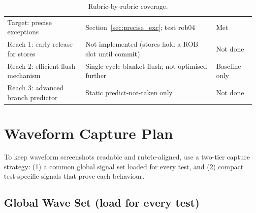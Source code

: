 \documentclass[11pt]{article}
\begin{document}
\begin{table}[h]
\begin{tabular}{p{4.5cm} p{9.5cm} l}
    Target: precise exceptions                         & Section~\ref{sec:precise_exc}; test rob04                                                           & Met             \\
    Reach 1: early release for stores                  & Not implemented (stores hold a ROB slot until commit)                                               & Not done        \\
    Reach 2: efficient flush mechanism                 & Single-cycle blanket flush; not optimised further                                                   & Baseline only   \\
    Reach 3: advanced branch predictor                 & Static predict-not-taken only                                                                       & Not done        \\
    \bottomrule
  \end{tabular}
  \caption{Rubric-by-rubric coverage.}
  \label{tbl:rubric}
\end{table}

\section{Waveform Capture Plan}

To keep waveform screenshots readable and rubric-aligned, use a two-tier capture
strategy: (1) a common global signal set loaded for every test, and
(2) compact test-specific signals that prove each behaviour.

\subsection{Global Wave Set (load for every test)}
\end{document}
